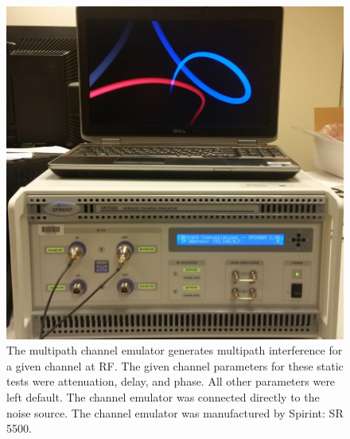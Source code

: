 \begin{figure}
	\centering\includegraphics[scale=0.5]{figures/eq_GPUimplementation/emu.jpg}
	\caption{The multipath channel emulator generates multipath interference for a given channel at RF. The given channel parameters for these static tests were attenuation, delay, and phase. All other parameters were left default. The channel emulator was connected directly to the noise source. The channel emulator was manufactured by Spirint: SR 5500.}
	\label{fig:emu}
\end{figure}
